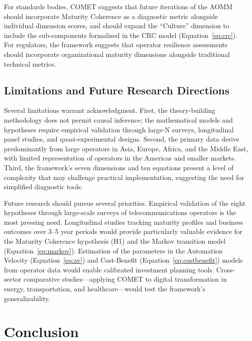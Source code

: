 \documentclass[12pt,a4paper]{article}
\begin{document}
For standards bodies, COMET suggests that future iterations of the AOMM should incorporate Maturity Coherence as a diagnostic metric alongside individual dimension scores, and should expand the ``Culture'' dimension to include the sub-components formalized in the CRC model (Equation~\ref{eq:crc}). For regulators, the framework suggests that operator resilience assessments should incorporate organizational maturity dimensions alongside traditional technical metrics.

\subsection{Limitations and Future Research Directions}

Several limitations warrant acknowledgment. First, the theory-building methodology does not permit causal inference; the mathematical models and hypotheses require empirical validation through large-N surveys, longitudinal panel studies, and quasi-experimental designs. Second, the primary data derive predominantly from large operators in Asia, Europe, Africa, and the Middle East, with limited representation of operators in the Americas and smaller markets. Third, the framework's seven dimensions and ten equations present a level of complexity that may challenge practical implementation, suggesting the need for simplified diagnostic tools.

Future research should pursue several priorities. Empirical validation of the eight hypotheses through large-scale surveys of telecommunications operators is the most pressing need. Longitudinal studies tracking maturity profiles and business outcomes over 3--5 year periods would provide particularly valuable evidence for the Maturity Coherence hypothesis (H1) and the Markov transition model (Equation~\ref{eq:markov}). Estimation of the parameters in the Automation Velocity (Equation~\ref{eq:av}) and Cost-Benefit (Equation~\ref{eq:costbenefit}) models from operator data would enable calibrated investment planning tools. Cross-sector comparative studies---applying COMET to digital transformation in energy, transportation, and healthcare---would test the framework's generalizability.

\section{Conclusion}
\end{document}
